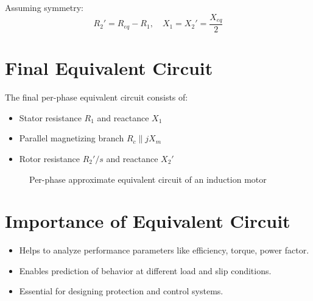 \documentclass[a4paper,12pt]{article}
\begin{document}
	Assuming symmetry:
	\[
	R_2' = R_{eq} - R_1, \quad X_1 = X_2' = \frac{X_{eq}}{2}
	\]
	
	\section{Final Equivalent Circuit}
	
	The final per-phase equivalent circuit consists of:
	\begin{itemize}
		\item Stator resistance $R_1$ and reactance $X_1$
		\item Parallel magnetizing branch $R_c \parallel jX_m$
		\item Rotor resistance $R_2'/s$ and reactance $X_2'$
	\end{itemize}
	
	\begin{figure}[H]
		\centering
		\caption{Per-phase approximate equivalent circuit of an induction motor}
	\end{figure}
	
	\section{Importance of Equivalent Circuit}
	
	\begin{itemize}
		\item Helps to analyze performance parameters like efficiency, torque, power factor.
		\item Enables prediction of behavior at different load and slip conditions.
		\item Essential for designing protection and control systems.
	\end{itemize}
	
\end{document}
